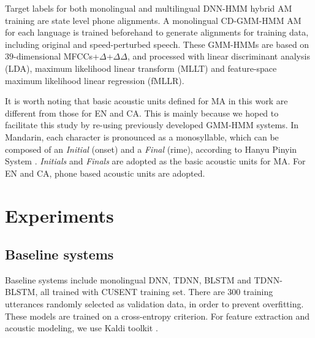 \documentclass[a4paper]{article}
\begin{document}
Target labels for both monolingual and multilingual  DNN-HMM hybrid AM training are state level phone alignments. A monolingual CD-GMM-HMM AM for each language is trained beforehand to generate alignments for training data, including original and speed-perturbed speech. These GMM-HMMs are based on $39$-dimensional MFCCs+$\Delta$+$\Delta \Delta$, and processed with linear discriminant analysis (LDA), maximum likelihood linear transform (MLLT) and feature-space maximum likelihood linear regression (fMLLR).

It is worth noting that basic acoustic units defined for MA in this work are different from those for EN and CA. This is mainly because we hoped to facilitate this study by re-using previously developed GMM-HMM systems. In Mandarin, each character is pronounced as a monosyllable, which can be composed of an \emph{Initial} (onset) and a \emph{Final} (rime), according to Hanyu Pinyin System \cite{wiki-no_url:xxx}. \emph{Initials} and \emph{Finals} are adopted as the basic acoustic units for MA. For EN and CA, phone based acoustic units are adopted.
\section{Experiments}
\label{sec:exp}
\subsection{Baseline systems}
\label{sec:baseline}
Baseline systems include monolingual DNN, TDNN, BLSTM and TDNN-BLSTM, all trained with CUSENT training set. There are $300$ training utterances randomly selected as validation data, in order to prevent overfitting. These models are trained on a  cross-entropy criterion. For feature extraction and  acoustic modeling, we use Kaldi toolkit \cite{povey2011kaldi}.
\end{document}
